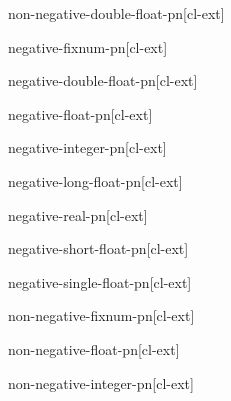 \documentclass[10pt,english]{book}
\begin{document}
\begin{function}{non-negative-double-float-p}{n}[cl-ext]
  
\end{function}

\begin{function}{negative-fixnum-p}{n}[cl-ext]
  
\end{function}

\begin{function}{negative-double-float-p}{n}[cl-ext]
  
\end{function}

\begin{function}{negative-float-p}{n}[cl-ext]
  
\end{function}

\begin{function}{negative-integer-p}{n}[cl-ext]
  
\end{function}

\begin{function}{negative-long-float-p}{n}[cl-ext]
  
\end{function}

\begin{function}{negative-real-p}{n}[cl-ext]
  
\end{function}

\begin{function}{negative-short-float-p}{n}[cl-ext]
  
\end{function}

\begin{function}{negative-single-float-p}{n}[cl-ext]
  
\end{function}

\begin{function}{non-negative-fixnum-p}{n}[cl-ext]
  
\end{function}

\begin{function}{non-negative-float-p}{n}[cl-ext]
  
\end{function}

\begin{function}{non-negative-integer-p}{n}[cl-ext]
  
\end{function}
\end{document}
